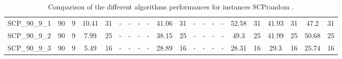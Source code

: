 \begin{sidewaystable}[!ht]
{\begin{tabular}{lcccccccccccccccccccc}
SCP\_90\_9\_1 & 90 & 9 &  \textcolor{blue2}{10.41} & 31 &  - &  - &  - &  - & 41.06 & 31 &  - &  - &  - &  - & 52.58 & 31 & 41.93 & 31 & 47.2 & 31 \\
SCP\_90\_9\_2 & 90 & 9 &  \textcolor{blue2}{7.99} & 25 &  - &  - &  - &  - & 38.15 & 25 &  - &  - &  - &  - & 49.3 & 25 & 41.99 & 25 & 50.68 & 25 \\
SCP\_90\_9\_3 & 90 & 9 &  \textcolor{blue2}{5.49} & 16 &  - &  - &  - &  - & 28.89 & 16 &  - &  - &  - &  - & 28.31 & 16 & 29.3 & 16 & 25.74 & 16 \\
\bottomrule
\end{tabular}
}%
\caption{Comparison of the different algorithms performances for instances SCPrandom .}
\label{tab:table_compare_SCPrandom }
\end{sidewaystable}
